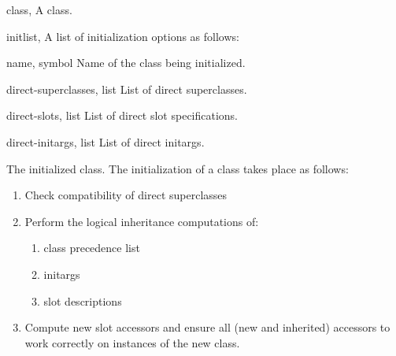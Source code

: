 %
\begin{optDefinition}
%
\begin{specargs}
    \item[class, \classref{class}] A class.
    \item[initlist, \classref{list}] A list of initialization options as follows:

    \begin{options}
        \item[name, symbol] Name of the class being initialized.
        \item[direct-superclasses, list] List of direct superclasses.
        \item[direct-slots, list] List of direct slot specifications.
        \item[direct-initargs, list] List of direct initargs.
    \end{options}
\end{specargs}
%
\result%
The initialized class.
%
\remarks%
The initialization of a class takes place as follows:
%
\begin{enumerate}
    \item Check compatibility of direct superclasses

    \item Perform the logical inheritance computations of:
    \begin{enumerate}
        \item class precedence list
        \item initargs
        \item slot descriptions
    \end{enumerate}

    \item Compute new slot accessors and ensure all (new and inherited)
    accessors to work correctly on instances of the new class.



\end{enumerate}
\end{optDefinition}
